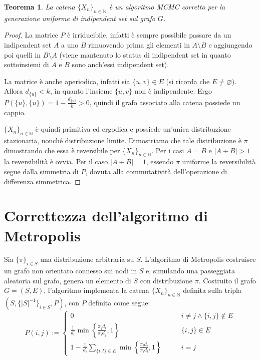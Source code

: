 \documentclass{article}
\theoremstyle{plain}
\newtheorem{thm}{Teorema}
\newcommand{\N}{\mathbb N}
\newcommand{\chain}[1]{\{#1_n\}_{n\in\N}}
\newcommand{\card}[1]{\left|#1\right|}
\renewcommand{\emptyset}{\varnothing}
\begin{document}
\begin{thm}
	La catena $\chain X$ è un algoritmo MCMC corretto per la generazione uniforme di indipendent set sul grafo $G$.
\end{thm}
\begin{proof}
	La matrice $P$ è irriducibile, infatti è sempre possibile passare da un indipendent set $A$ a uno $B$ rimuovendo prima gli elementi in $A\setminus B$ e aggiungendo poi quelli in $B\setminus A$ (viene mantenuto lo status di indipendent set in quanto sottoinsiemi di $A$ e $B$ sono anch'essi indipendent set).

	La matrice è anche aperiodica, infatti sia $\{u,v\}\in E$ (si ricorda che $E\ne\emptyset$). Allora $d_{\{u\}}<k$, in quanto l'insieme $\{u,v\}$ non è indipendente. Ergo $P(\{u\},\{u\})=1-\frac{d_{\{u\}}}{k}>0$, quindi il grafo associato alla catena possiede un cappio.

	$\chain X$ è quindi primitiva ed ergodica e possiede un'unica distribuzione stazionaria, nonché distribuzione limite. Dimostriamo che tale distribuzione è $\pi$ dimostrando che essa è reversibile per $\chain X$. Per i casi $A=B$ e $\card{A\div B}>1$ la reversibilità è ovvia. Per il caso $\card{A\div B}=1$, essendo $\pi$ uniforme la reversibilità segue dalla simmetria di $P$, dovuta alla commutatività dell'operazione di differenza simmetrica.
\end{proof}




\section{Correttezza dell'algoritmo di Metropolis}

Sia $\{\pi\}_{i\in S}$ una distribuzione arbitraria su $S$. L'algoritmo di Metropolis costruisce un grafo non orientato connesso sui nodi in $S$ e, simulando una passeggiata aleatoria sul grafo, genera un elemento di $S$ con distribuzione $\pi$.
Costruito il grafo $G=(S,E)$, l'algoritmo implementa la catena $\chain X$ definita sulla tripla $(S,\{\card S^{-1}\}_{i\in S},P)$, con $P$ definita come segue:
\begin{equation*}
	P(i,j):=\begin{cases}
		0                                                                                                    & \qquad i\ne j\land \{i,j\}\notin E \\[1ex]
		\displaystyle \frac{1}{d_i} \min\left\{\frac{\pi_j d_i}{\pi_i d_j},1\right\}                         & \qquad \{i,j\}\in E                \\[2ex]
		\displaystyle 1 - \frac{1}{d_i} \sum_{\{i,l\}\in E} \min\left\{\frac{\pi_l d_i}{\pi_i d_l},1\right\} & \qquad i=j
	\end{cases}
\end{equation*}
\end{document}

